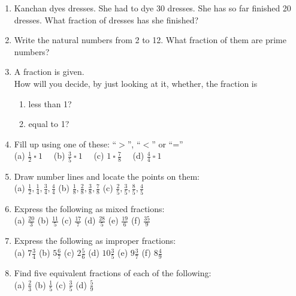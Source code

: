 \documentclass[a4paper,leqno,12pt]{amsart}
\begin{document}
\begin{enumerate}
\item Kanchan dyes dresses. She had to dye 30 dresses. She has so far finished 20
dresses. What fraction of dresses has she finished?

\item Write the natural numbers from 2 to 12. What fraction of them are prime numbers?

\item A fraction is given.\\
How will you decide, by just looking at it, whether, the fraction is
\begin{enumerate}
 \item less than 1?
 \item equal to 1?
\end{enumerate}

\item Fill up using one of these:  \enquote{$>$},  \enquote{$<$} or \enquote{=} \\

(a) $\frac{1}{2} \ \square \ 1 \quad$ (b) $\frac{3}{5} \ \square \ 1 \quad$ (c) $1 \ \square \ \frac{7}{8} \quad$ (d) $\frac{4}{4} \ \square \ 1 \quad$
 
\item Draw number lines and locate the points on them:\\

(a) $\frac{1}{2}, \frac{1}{4}, \frac{3}{4}, \frac{4}{4}$ \quad (b) $\frac{1}{8}, \frac{2}{8}, \frac{3}{8}, \frac{7}{8}$ \quad (c) $\frac{2}{5}, \frac{3}{5}, \frac{8}{5}, \frac{4}{5}$

\item Express the following as mixed fractions:\\

(a) $\frac{20}{3}$ \quad (b) $\frac{11}{5}$ \quad (c) $\frac{17}{7}$ \quad (d) $\frac{28}{5}$ \quad (e) $\frac{19}{6}$ \quad (f) $\frac{35}{9}$

\item Express the following as improper fractions:\\

(a) $7\frac{3}{4}$ \quad (b) $5\frac{6}{7}$ \quad (c) $2\frac{5}{6}$ \quad (d) $10\frac{3}{5}$ \quad (e) $9\frac{3}{7}$ \quad (f) $8\frac{4}{9}$

\item Find five equivalent fractions of each of the following:\\

(a) $\frac{2}{3}$ \quad (b) $\frac{1}{5}$ \quad (c) $\frac{3}{5}$ \quad (d) $\frac{5}{9}$


\end{enumerate}
\end{document}

